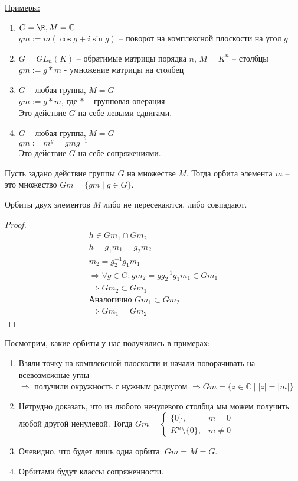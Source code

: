 \underline{Примеры:}
\begin{enumerate}
    \item $G = \R, M = \mathbb{C}$ \\ $gm := m(\cos g + i\sin g)$ -- поворот на комплексной плоскости на угол $g$
    \item $G = GL_n(K)$ -- обратимые матрицы порядка $n$, $M = K^n$ -- столбцы \\ $gm := g * m$ - умножение матрицы на столбец
    \item $G$ -- любая группа, $M = G$ \\ $gm := g * m$, где $*$ -- групповая операция \\ Это действие $G$ на себе левыми сдвигами.
    \item $G$ -- любая группа, $M = G$ \\ $gm := m^g = gmg^{-1}$ \\ Это действие $G$ на себе сопряжениями.
\end{enumerate}

\begin{conj}
    Пусть задано действие группы $G$ на множестве $M$.
    Тогда орбита элемента $m$ -- это множество $Gm = \{gm\; | \; g \in G\}$.
\end{conj}

\begin{theorem-non}
    Орбиты двух элементов $M$ либо не пересекаются, либо совпадают.
\end{theorem-non}
\begin{proof}
    \begin{gather*}
        h \in Gm_1 \cap Gm_2 \\
        h = g_1m_1 = g_2m_2 \\
        m_2 = g_2^{-1}g_1m_1  \\
        \Rightarrow \forall g \in G: gm_2 = gg_2^{-1}g_1m_1 \in Gm_1 \\
        \Rightarrow Gm_2 \subset Gm_1 \\
        \text{Аналогично } Gm_1 \subset Gm_2 \\
        \Rightarrow Gm_1 = Gm_2
    \end{gather*}
\end{proof}
Посмотрим, какие орбиты у нас получились в примерах:
\begin{enumerate}
    \item Взяли точку на комплексной плоскости и начали поворачивать на всевозможные углы \\ 
    $\Rightarrow$ получили окружность с нужным радиусом $\Rightarrow Gm = \{ z \in \mathbb{C} \; | \; |z| = |m| \}$
    \item Нетрудно доказать, что из любого ненулевого столбца мы можем получить любой другой ненулевой. 
    Тогда $Gm = \begin{cases}
        \{ 0 \}, & m = 0 \\
        K^n \setminus \{ 0 \}, & m \neq 0
    \end{cases} $
    \item Очевидно, что будет лишь одна орбита: $Gm = M = G$.
    \item Орбитами будут классы сопряженности.
\end{enumerate}

